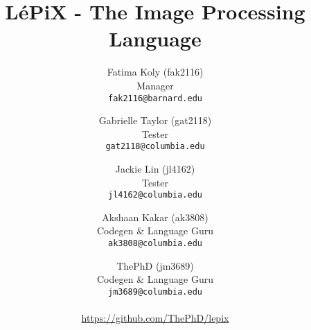 \documentclass[11pt,letterpaper]{report}
\author{
	Fatima Koly (fak2116)\\
	Manager\\
	\texttt{fak2116@barnard.edu}
	\and
	Gabrielle Taylor (gat2118)\\
	Tester\\
	\texttt{gat2118@columbia.edu}
	\and
	Jackie Lin (jl4162)\\
	Tester\\
	\texttt{jl4162@columbia.edu}
	\and
	Akshaan Kakar (ak3808)\\ 
	Codegen \& Language Guru\\
	\texttt{ak3808@columbia.edu}
	\and
	ThePhD (jm3689)\\
	Codegen \& Language Guru\\
	\texttt{jm3689@columbia.edu}
	\\\\
	\url{https://github.com/ThePhD/lepix}
}
\title{LéPiX - The Image Processing Language}
\begin{document}
	\renewcommand{\arraystretch}{1.1}
	\newcommand{\lepix}{LéPiX}
	\maketitle
	\tableofcontents
	\pagebreak
	
\end{document}
